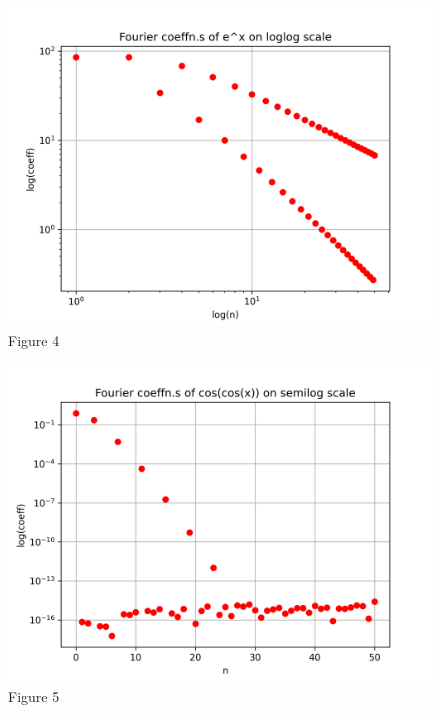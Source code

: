 \documentclass[11pt, a4paper]{article}
\begin{document}
\begin{figure}[!tbh]
\centering
\includegraphics[scale=0.6]{assn4_plot4.png}
\caption{Figure 4}
\label{fig:plot4}
\end{figure} 

\begin{figure}[!tbh]
\centering
\includegraphics[scale=0.6]{assn4_plot5.png}
\caption{Figure 5}
\label{fig:plot5}
\end{figure} 
\end{document}
